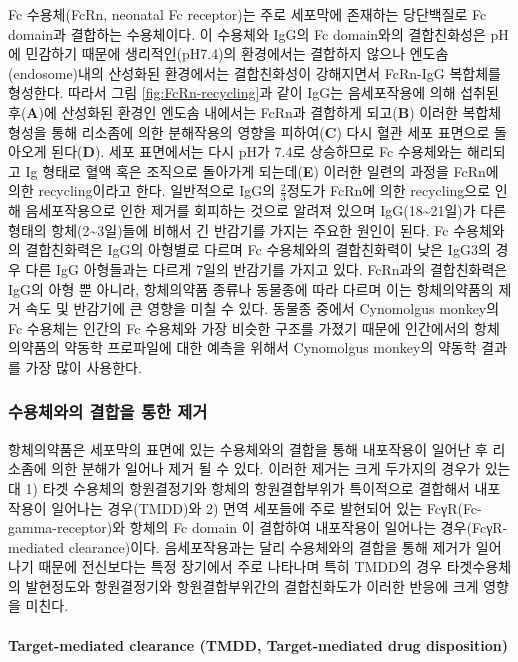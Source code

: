 \documentclass[
  11pt,
  krantz2, a4paper, twoside]{krantz}
\theoremstyle{definition}
\theoremstyle{definition}
\theoremstyle{definition}
\theoremstyle{definition}
\theoremstyle{remark}
\begin{document}
Fc 수용체(FcRn, neonatal Fc receptor)는 주로 세포막에 존재하는 당단백질로 Fc domain과 결합하는 수용체이다. 이 수용체와 IgG의 Fc domain와의 결합친화성은 pH에 민감하기 때문에 생리적인(pH7.4)의 환경에서는 결합하지 않으나 엔도솜(endosome)내의 산성화된 환경에서는 결합친화성이 강해지면서 FcRn-IgG 복합체를 형성한다. 따라서 그림 \ref{fig:FcRn-recycling}과 같이 IgG는 음세포작용에 의해 섭취된 후(\textbf{A})에 산성화된 환경인 엔도솜 내에서는 FcRn과 결합하게 되고(\textbf{B}) 이러한 복합체 형성을 통해 리소좀에 의한 분해작용의 영향을 피하여(\textbf{C}) 다시 혈관 세포 표면으로 돌아오게 된다(\textbf{D}). 세포 표면에서는 다시 pH가 7.4로 상승하므로 Fc 수용체와는 해리되고 Ig 형태로 혈액 혹은 조직으로 돌아가게 되는데(\textbf{E}) 이러한 일련의 과정을 FcRn에 의한 recycling이라고 한다.
일반적으로 IgG의 \(\frac{2}{3}\)정도가 FcRn에 의한 recycling으로 인해 음세포작용으로 인한 제거를 회피하는 것으로 알려져 있으며 IgG(18\textasciitilde21일)가 다른 형태의 항체(2\textasciitilde3일)들에 비해서 긴 반감기를 가지는 주요한 원인이 된다. Fc 수용체와의 결합친화력은 IgG의 아형별로 다르며 Fc 수용체와의 결합친화력이 낮은 IgG3의 경우 다른 IgG 아형들과는 다르게 7일의 반감기를 가지고 있다.
FcRn과의 결합친화력은 IgG의 아형 뿐 아니라, 항체의약품 종류나 동물종에 따라 다르며 이는 항체의약품의 제거 속도 및 반감기에 큰 영향을 미칠 수 있다. 동물종 중에서 Cynomolgus monkey의 Fc 수용체는 인간의 Fc 수용체와 가장 비슷한 구조를 가졌기 때문에 인간에서의 항체의약품의 약동학 프로파일에 대한 예측을 위해서 Cynomolgus monkey의 약동학 결과를 가장 많이 사용한다.

\subsubsection{수용체와의 결합을 통한 제거}\label{uxc218uxc6a9uxccb4uxc640uxc758-uxacb0uxd569uxc744-uxd1b5uxd55c-uxc81cuxac70}

항체의약품은 세포막의 표면에 있는 수용체와의 결합을 통해 내포작용이 일어난 후 리소좀에 의한 분해가 일어나 제거 될 수 있다. 이러한 제거는 크게 두가지의 경우가 있는대 1) 타겟 수용체의 항원결정기와 항체의 항원결합부위가 특이적으로 결합해서 내포작용이 일어나는 경우(TMDD)와 2) 면역 세포들에 주로 발현되어 있는 FcγR(Fc-gamma-receptor)와 항체의 Fc domain 이 결합하여 내포작용이 일어나는 경우(FcγR-mediated clearance)이다. 음세포작용과는 달리 수용체와의 결합을 통해 제거가 일어나기 때문에 전신보다는 특정 장기에서 주로 나타나며 특히 TMDD의 경우 타겟수용체의 발현정도와 항원결정기와 항원결합부위간의 결합친화도가 이러한 반응에 크게 영향을 미친다.

\paragraph{Target-mediated clearance (TMDD, Target-mediated drug disposition)}\label{target-mediated-clearance-tmdd-target-mediated-drug-disposition}
\end{document}
